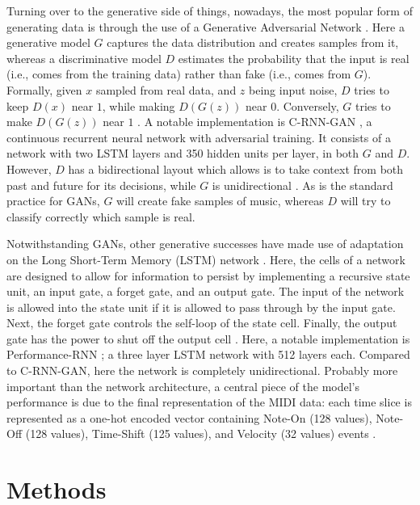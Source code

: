 \documentclass[a4paper]{book}
\begin{document}
Turning over to the generative side of things, nowadays, the most popular form of generating data is through the use of a Generative Adversarial Network \parencite[GAN;][]{goodfellow_generative_2014}. Here a generative model $G$ captures the data distribution and creates samples from it, whereas a discriminative model $D$ estimates the probability that the input is real (i.e., comes from the training data) rather than fake (i.e., comes from $G$). Formally, given $x$ sampled from real data, and $z$ being input noise, $D$ tries to keep $D(x)$ near $1$, while making $D(G(z))$ near $0$. Conversely, $G$ tries to make $D(G(z))$ near $1$ \parencite{goodfellow_nips_2016}. A notable implementation is C-RNN-GAN \parencite{mogren_c-rnn-gan_2016}, a continuous recurrent neural network with adversarial training. It consists of a network with two LSTM layers and 350 hidden units per layer, in both $G$ and $D$. However, $D$ has a bidirectional layout which allows is to take context from both past and future for its decisions, while $G$ is unidirectional \parencite{mogren_c-rnn-gan_2016}. As is the standard practice for GANs, $G$ will create fake samples of music, whereas $D$ will try to classify correctly which sample is real.

Notwithstanding GANs, other generative successes have made use of adaptation on the Long Short-Term Memory (LSTM) network \parencite{hochreiter_long_1997}. Here, the cells of a network are designed to allow for information to persist by implementing a recursive state unit, an input gate, a forget gate, and an output gate. The input of the network is allowed into the state unit if it is allowed to pass through by the input gate. Next, the forget gate controls the self-loop of the state cell. Finally, the output gate has the power to shut off the output cell \parencite{goodfellow_deep_2016}. Here, a notable implementation is Performance-RNN \parencite{oore_this_2018}; a three layer LSTM network with 512 layers each. Compared to C-RNN-GAN, here the network is completely unidirectional. Probably more important than the network architecture, a central piece of the model's performance is due to the final representation of the MIDI data: each time slice is represented as a one-hot encoded vector containing Note-On (128 values), Note-Off (128 values), Time-Shift (125 values), and Velocity (32 values) events \parencite{oore_this_2018}. 

\chapter{Methods}\label{chap:methods}
\end{document}
